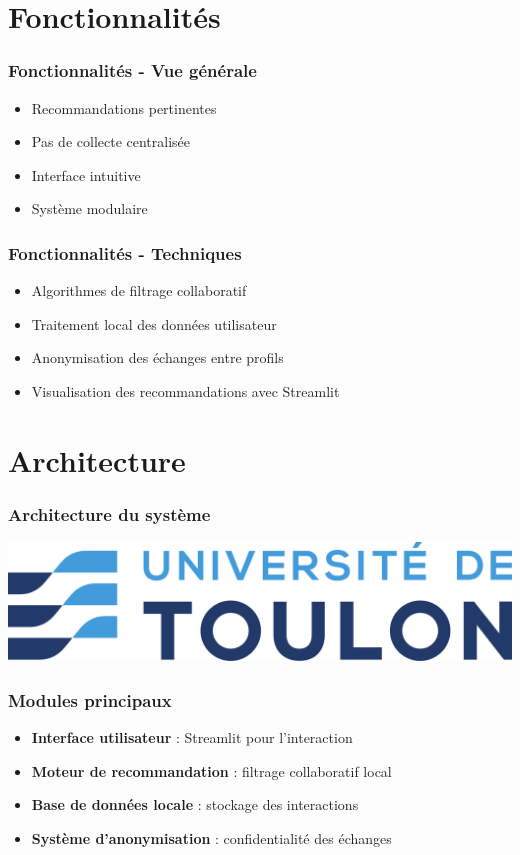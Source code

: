\documentclass{beamer}
\begin{document}
\section{Fonctionnalités}
\begin{frame}
    \frametitle{Fonctionnalités - Vue générale}
    \begin{itemize}
        \item Recommandations pertinentes
        \item Pas de collecte centralisée
        \item Interface intuitive
        \item Système modulaire
    \end{itemize}
\end{frame}

\begin{frame}
    \frametitle{Fonctionnalités - Techniques}
    \begin{itemize}
        \item Algorithmes de filtrage collaboratif
        \item Traitement local des données utilisateur
        \item Anonymisation des échanges entre profils
        \item Visualisation des recommandations avec Streamlit
    \end{itemize}
\end{frame}

\section{Architecture}
\begin{frame}
    \frametitle{Architecture du système}
    \begin{center}
        \includegraphics[width=0.8\linewidth]{logo}
    \end{center}
\end{frame}

\begin{frame}
    \frametitle{Modules principaux}
    \begin{itemize}
        \item \textbf{Interface utilisateur} : Streamlit pour l’interaction
        \item \textbf{Moteur de recommandation} : filtrage collaboratif local
        \item \textbf{Base de données locale} : stockage des interactions
        \item \textbf{Système d’anonymisation} : confidentialité des échanges
    \end{itemize}
\end{frame}
\end{document}
